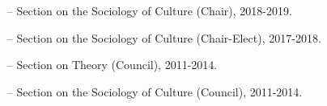 \begin{itemize}[itemsep=-0.5ex]
    \item[--] Section on the Sociology of Culture (Chair), 2018-2019.
    \item[--] Section on the Sociology of Culture (Chair-Elect), 2017-2018.
    \item[--] Section on Theory (Council), 2011-2014.
    \item[--] Section on the Sociology of Culture (Council), 2011-2014.
\end{itemize}
\newpage